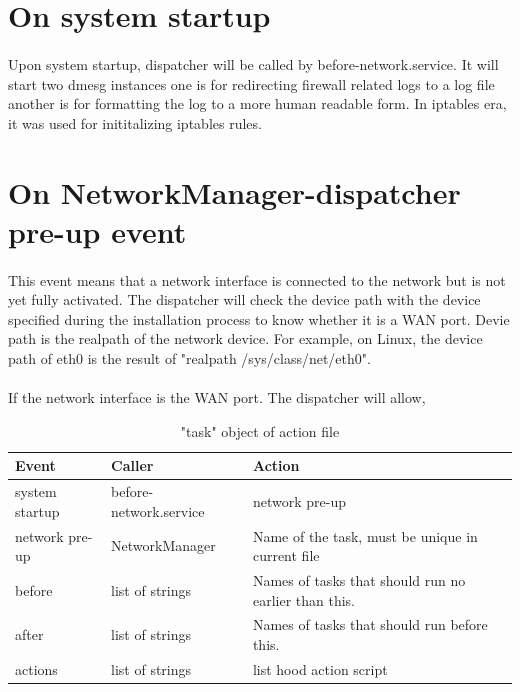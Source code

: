 \documentclass[mscthesis]{usiinfthesis}
\begin{document}
\section{On system startup}
\paragraph{}
Upon system startup, dispatcher will be called by before-network.service. It will start two dmesg instances one is for redirecting firewall related logs to a log file another is for formatting the log to a more human readable form. In iptables era, it was used for inititalizing iptables rules.

\section{On NetworkManager-dispatcher pre-up event}
\paragraph{}
This event means that a network interface is connected to the network but is not yet fully activated. The dispatcher will check the device path with the device specified during the installation process to know whether it is a WAN port. Devie path is the realpath of the network device. For example, on Linux, the device path of eth0 is the result of "realpath /sys/class/net/eth0".
\paragraph{}
If the network interface is the WAN port. The dispatcher will allow,
\begin{table}[H]
  \centering
  \begin{tabular}{|p{23mm}|p{24mm}|p{78mm}|}
    \hline
    Event          & Caller                 & Action                                               \\
    \hline
    system startup & before-network.service & network pre-up                                       \\
    network pre-up & NetworkManager         & Name of the task, must be unique in current file     \\
    before         & list of strings        & Names of tasks that should run no earlier than this. \\
    after          & list of strings        & Names of tasks that should run before this.          \\
    actions        & list of strings        & list hood action script                              \\
    \hline
  \end{tabular}
  \caption{"task" object of action file}
  \label{tab:dispatcher_actions}
\end{table}
\end{document}

